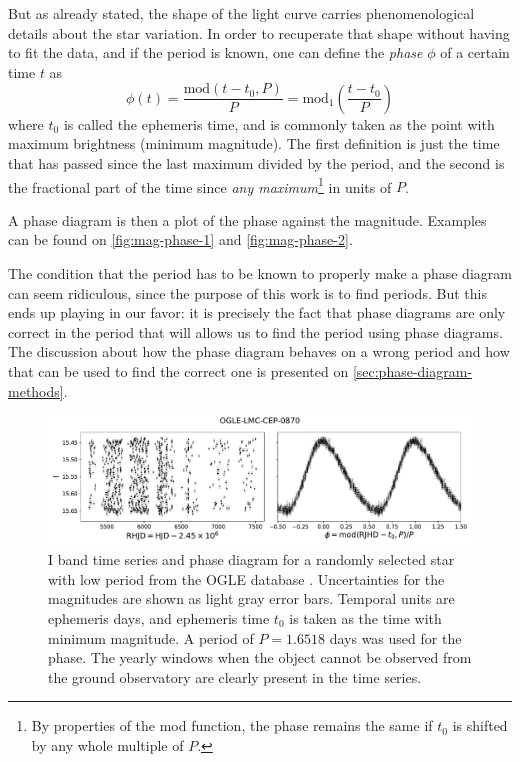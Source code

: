 	But as already stated, the shape of the light curve carries phenomenological details about the star variation.
	In order to recuperate that shape without having to fit the data, and if the period is known,
	one can define the \textit{phase} $\phi$ of a certain time $t$ as
	\begin{equation}
		\phi(t) = \frac{\text{mod}(t-t_0,P)}{P} = \text{mod}_1\left(\frac{t-t_0}{P}\right) \label{eq:phase}
	\end{equation}
	where $t_0$ is called the ephemeris time, and is commonly taken as the point with maximum brightness (minimum magnitude).
	The first definition is just the time that has passed since the last maximum divided by the period, 
	and the second is the fractional part of the time since \textit{any maximum}\footnote{
		By properties of the mod function, the phase remains the same if $t_0$ is shifted by any whole multiple of $P$.
	} in units of $P$.
	
	A phase diagram is then a plot of the phase against the magnitude. 
	Examples can be found on \autoref{fig:mag-phase-1} and \autoref{fig:mag-phase-2}.
	
	The condition that the period has to be known to properly make a phase diagram can seem ridiculous, 
	since the purpose of this work is to find periods.
	But this ends up playing in our favor: 
	it is precisely the fact that phase diagrams are only correct in the period that will allows us to find the period using phase diagrams.
	The discussion about how the phase diagram behaves on a wrong period and how that can be used to find the correct one is presented on \autoref{sec:phase-diagram-methods}.
	
	\begin{figure}
		\centering
		\includegraphics[width=\textwidth]{img/mag_phase_LMC_0870.pdf}
		\caption[Light curve of OGLE-LMC-CEP-0870]{
			I band time series and phase diagram for a randomly selected star with low period from the OGLE database \citep{OGLE2016}.
			Uncertainties for the magnitudes are shown as light gray error bars.
			Temporal units are ephemeris days, and ephemeris time $t_0$ is taken as the time with minimum magnitude.
			A period of $P=1.6518$ days was used for the phase.
			The yearly windows when the object cannot be observed from the ground observatory are clearly present in the time series.
		} 
		\label{fig:mag-phase-1}
	\end{figure}
	
